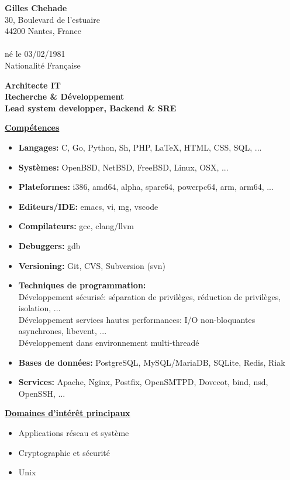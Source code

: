 \documentclass[a4paper,10pt]{letter}
\begin{document}
\textbf{Gilles Chehade}\\
30, Boulevard de l'estuaire\\
44200 Nantes, France\\
\\
n\'e le 03/02/1981\\
Nationalit\'e Fran\c caise\\

\begin{center}
  \large
  \textbf {
    Architecte IT\\
    Recherche \& D\'eveloppement\\
    Lead system developper, Backend \& SRE\\
  }
\end{center}

\normalsize

\underline{\textbf{Comp\'etences}}\\
\begin{itemize}
\item	\textbf{Langages:}
  C, Go, Python, Sh, PHP, \LaTeX, HTML, CSS, SQL, ...
\item	\textbf{Syst\`emes:}
  OpenBSD, NetBSD, FreeBSD, Linux, OSX, ...
\item	\textbf{Plateformes:}
  i386, amd64, alpha, sparc64, powerpc64, arm, arm64, ...
\item	\textbf{Editeurs/IDE:}
  emacs, vi, mg, vscode
\item	\textbf{Compilateurs:}
  gcc, clang/llvm
\item	\textbf{Debuggers:}
  gdb
\item	\textbf{Versioning:}
  Git, CVS, Subversion (svn)
\item	\textbf{Techniques de programmation:}\\
  D\'eveloppement s\'ecuris\'e: s\'eparation de
  privil\`eges, r\'eduction de privil\`eges, isolation, ...\\
  D\'eveloppement services hautes performances:
  I/O non-bloquantes asynchrones, libevent, ...\\
  D\'eveloppement dans environnement multi-thread\'e
\item	\textbf{Bases de donn\'ees:}
  PostgreSQL, MySQL/MariaDB, SQLite, Redis, Riak
\item	\textbf{Services:}
  Apache, Nginx, Postfix, OpenSMTPD, Dovecot, bind, nsd, OpenSSH, ...\\
\end{itemize}

\underline{\textbf{Domaines d'int\'er\^et principaux}}\\
\begin{itemize}
\item Applications r\'eseau et syst\`eme
\item Cryptographie et s\'ecurit\'e
\item Unix\\
\end{itemize}
\end{document}
